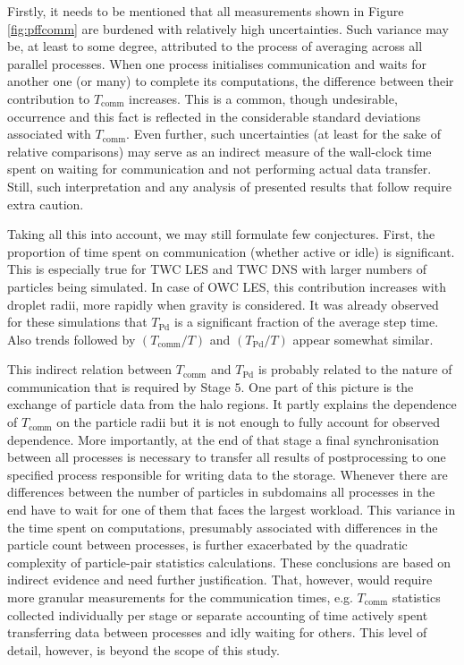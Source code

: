 \documentclass{pracamgren}
\begin{document}
Firstly, it needs to be mentioned that all measurements shown in Figure \ref{fig:pffcomm} are burdened with relatively high uncertainties.
Such variance may be, at least to some degree, attributed to the process of averaging across all parallel processes.
When one process initialises communication and waits for another one (or many) to complete its computations, the difference between their contribution to $T_{\text{comm}}$ increases.
This is a common, though undesirable, occurrence and this fact is reflected in the considerable standard deviations associated with $T_{\text{comm}}$.
Even further, such uncertainties (at least for the sake of relative comparisons) may serve as an indirect measure of the wall-clock time spent on waiting for communication and not performing actual data transfer.
Still, such interpretation and any analysis of presented results that follow require extra caution.

Taking all this into account, we may still formulate few conjectures.
First, the proportion of time spent on communication (whether active or idle) is significant.
This is especially true for TWC LES and TWC DNS with larger numbers of particles being simulated.
In case of OWC LES, this contribution increases with droplet radii, more rapidly when gravity is considered.
It was already observed for these simulations that $T_{\text{Pd}}$ is a significant fraction of the average step time.
Also trends followed by  $(T_{\text{comm}} / T)$ and $(T_{\text{Pd}} / T)$ appear somewhat similar.

This indirect relation between $T_{\text{comm}}$ and $T_{\text{Pd}}$ is probably related to the nature of communication that is required by Stage $5$.
One part of this picture is the exchange of particle data from the halo regions.
It partly explains the dependence of $T_{\text{comm}}$ on the particle radii but it is not enough to fully account for observed dependence.
More importantly, at the end of that stage a final synchronisation between all processes is necessary to transfer all results of postprocessing to one specified process responsible for writing data to the storage.
Whenever there are differences between the number of particles in subdomains all processes in the end have to wait for one of them that faces the largest workload.
This variance in the time spent on computations, presumably associated with differences in the particle count between processes, is further exacerbated by the quadratic complexity of particle-pair statistics calculations.
These conclusions are based on indirect evidence and need further justification.
That, however, would require more granular measurements for the communication times, e.g. $T_{\text{comm}}$ statistics collected individually per stage or separate accounting of time actively spent transferring data between processes and idly waiting for others.
This level of detail, however, is beyond the scope of this study.
\end{document}
